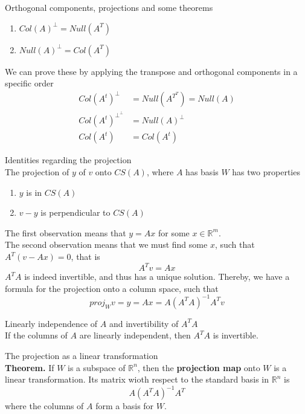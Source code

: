 \documentclass[journal, letterpaper]{IEEEtran}
\begin{document}
    \begin{mybox}{Orthogonal components, projections and some theorems}
        \begin{enumerate}
            \item $Col(A)^\perp = Null(A^T)$
            \item $Null(A)^\perp = Col(A^T)$
        \end{enumerate}
        We can prove these by applying the transpose and orthogonal components in a specific order 
        \begin{align*}
            Col(A^t)^\perp &= Null(A^{T^T}) = Null(A) \\
            Col(A^t)^{\perp^\perp} &= Null(A)^\perp \\
            Col(A^t) &= Col(A^t)
        \end{align*}
    \end{mybox}
    \begin{myboxg}{Identities regarding the projection} \\ 
        The projection of $y$ of $v$ onto $CS(A)$, where $A$ has basis $W$ has two properties
        \begin{enumerate}
            \item $y$ is in $CS(A)$
            \item $v - y$ is perpendicular to $CS(A)$
        \end{enumerate}
        The first observation means that $y = Ax$ for some $x \in \mathbb{R}^m$. 
        \newline \\
        The second observation means that we must find some $x$, such that $A^T(v - Ax) = 0$, that is
        $$ A^Tv = Ax$$
        $A^TA$ is indeed invertible, and thus has a unique solution. Thereby, we have a formula for the projection onto a column space, such that
        $$ proj_Wv = y = Ax = A(A^TA)^{-1}A^Tv$$
    \end{myboxg}
    \begin{myboxr}{Linearly independence of $A$ and invertibility of $A^TA$} \\ 
        If the columns of $A$ are linearly independent, then $A^TA$ is invertible.
    \end{myboxr}
    \begin{mybox}{The projection as a linear transformation} \\ 
        \textbf{Theorem.} If $W$ is a subspace of $\mathbb{R}^n$, then the \textbf{projection map} onto $W$ is a linear transformation. Its 
        matrix wioth respect to the standard basis in $\mathbb{R}^n$ is
        $$ A(A^TA)^{-1}A^T$$ 
        where the columns of $A$ form a basis for $W$.
    \end{mybox}
\end{document}
